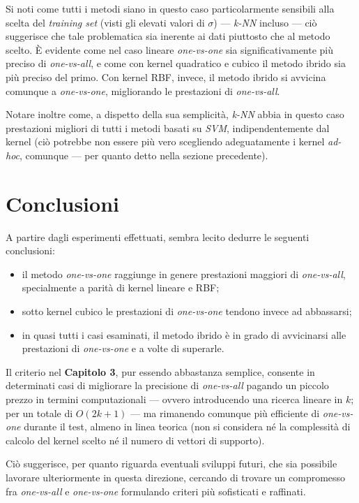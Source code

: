 Si noti come tutti i metodi siano in questo caso particolarmente sensibili alla scelta del \textit{training set} (visti gli elevati valori di $\sigma$) --- \textit{k-NN} incluso --- ciò suggerisce che tale problematica sia inerente ai dati piuttosto che al metodo scelto. È evidente come nel caso lineare \textit{one-vs-one} sia significativamente più preciso di \textit{one-vs-all}, e come con kernel quadratico e cubico il metodo ibrido sia più preciso del primo. Con kernel RBF, invece, il metodo ibrido si avvicina comunque a \textit{one-vs-one}, migliorando le prestazioni di \textit{one-vs-all}.

Notare inoltre come, a dispetto della sua semplicità, \textit{k-NN} abbia in questo caso prestazioni migliori di tutti i metodi basati su \textit{SVM}, indipendentemente dal kernel (ciò potrebbe non essere più vero scegliendo adeguatamente i kernel \textit{ad-hoc}, comunque --- per quanto detto nella sezione precedente).
\section{Conclusioni}

A partire dagli esperimenti effettuati, sembra lecito dedurre le seguenti conclusioni:

\begin{itemize}
\item{il metodo \textit{one-vs-one} raggiunge in genere prestazioni maggiori di \textit{one-vs-all}, specialmente a parità di kernel lineare e RBF;}

\item{sotto kernel cubico le prestazioni di \textit{one-vs-one} tendono invece ad abbassarsi;}

\item{in quasi tutti i casi esaminati, il metodo ibrido è in grado di avvicinarsi alle prestazioni di \textit{one-vs-one} e a volte di superarle.}
\end{itemize}
 
Il criterio nel \textbf{Capitolo 3}, pur essendo abbastanza semplice, consente in determinati casi di migliorare la precisione di \textit{one-vs-all} pagando un piccolo prezzo in termini computazionali --- ovvero introducendo una ricerca lineare in $k$; per un totale di $O(2k +1)$ --- ma rimanendo comunque più efficiente di \textit{one-vs-one} durante il test, almeno in linea teorica (non si considera né la complessità di calcolo del kernel scelto né il numero di vettori di supporto).

Ciò suggerisce, per quanto riguarda eventuali sviluppi futuri, che sia possibile lavorare ulteriormente in questa direzione, cercando di trovare un compromesso fra \textit{one-vs-all} e \textit{one-vs-one} formulando criteri più sofisticati e raffinati.

%